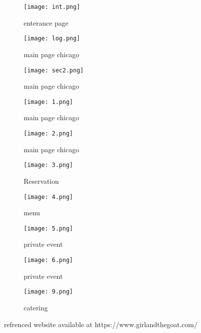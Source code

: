 \documentclass{article}
\begin{document}
\begin{figure}
  \centering
  \texttt{[image: int.png]}
  \caption{enterance page}

\end{figure} 

\begin{figure}
  \centering
  \texttt{[image: log.png]}
  \caption{main page chicago}

\end{figure} 

\begin{figure}
  \centering
  \texttt{[image: sec2.png]}
  \caption{main page chicago}

\end{figure} 

\begin{figure}
  \centering
  \texttt{[image: 1.png]}
  \caption{main page chicago}

\end{figure} 


\begin{figure}
  \centering
  \texttt{[image: 2.png]}
  \caption{main page chicago}

\end{figure} 

\begin{figure}
  \centering
  \texttt{[image: 3.png]}
  \caption{Reservation}

\end{figure} 

\begin{figure}
  \centering
  \texttt{[image: 4.png]}
  \caption{menu}

\end{figure} 

\begin{figure}
  \centering
  \texttt{[image: 5.png]}
  \caption{private event}

\end{figure} 

\begin{figure}
  \centering
  \texttt{[image: 6.png]}
  \caption{private event}

\end{figure} 

\begin{figure}
  \centering
  \texttt{[image: 9.png]}
  \caption{catering}

\end{figure} 




\begin{thebibliography}{00}

\bibitem{} refrenced website available at https://www.girlandthegoat.com/

\end{thebibliography}
\end{document}
